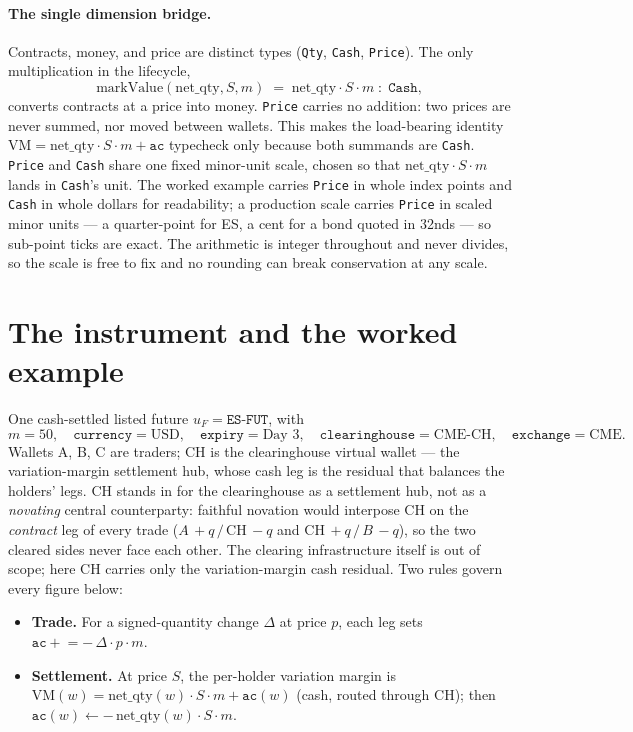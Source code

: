 \documentclass[11pt]{article}
\newcommand{\ac}{\texttt{ac}}
\newcommand{\netq}{\mathrm{net\_qty}}
\newcommand{\code}[1]{\texttt{#1}}
\newcommand{\unit}{u_{F}}
\newcommand{\mult}{m}
\begin{document}
\paragraph{The single dimension bridge.} Contracts, money, and price are distinct types
(\code{Qty}, \code{Cash}, \code{Price}). The only multiplication in the lifecycle,
\[
\mathrm{markValue}(\netq, S, \mult) \;=\; \netq \cdot S \cdot \mult \;:\; \code{Cash},
\]
converts contracts at a price into money. \code{Price} carries no addition: two prices are never
summed, nor moved between wallets. This makes the load-bearing identity
$\mathrm{VM}=\netq\cdot S\cdot\mult+\ac$ typecheck only because both summands are \code{Cash}.
\code{Price} and \code{Cash} share one fixed minor-unit scale, chosen so that $\netq\cdot S\cdot\mult$
lands in \code{Cash}'s unit. The worked example carries \code{Price} in whole index points and
\code{Cash} in whole dollars for readability; a production scale carries \code{Price} in scaled minor
units --- a quarter-point for ES, a cent for a bond quoted in 32nds --- so sub-point ticks are exact.
The arithmetic is integer throughout and never divides, so the scale is free to fix and no rounding can
break conservation at any scale.

\section{The instrument and the worked example}

One cash-settled listed future $\unit=\code{ES-FUT}$, with
\[
\mult=50,\quad \code{currency}=\text{USD},\quad \code{expiry}=\text{Day }3,\quad
\code{clearinghouse}=\text{CME-CH},\quad \code{exchange}=\text{CME}.
\]
Wallets A, B, C are traders; CH is the clearinghouse virtual wallet --- the variation-margin settlement
hub, whose cash leg is the residual that balances the holders' legs. CH stands in for the clearinghouse
as a settlement hub, not as a \emph{novating} central counterparty: faithful novation would interpose CH
on the \emph{contract} leg of every trade ($A\,{+}q\,/\,\text{CH}\,{-}q$ and $\text{CH}\,{+}q\,/\,B\,{-}q$),
so the two cleared sides never face each other. The clearing infrastructure itself is out of scope; here
CH carries only the variation-margin cash residual. Two rules govern every figure below:

\begin{itemize}
\item \textbf{Trade.} For a signed-quantity change $\Delta$ at price $p$, each leg sets
$\ac \mathrel{+}= -\,\Delta\cdot p\cdot \mult$.
\item \textbf{Settlement.} At price $S$, the per-holder variation margin is
$\mathrm{VM}(w)=\netq(w)\cdot S\cdot \mult + \ac(w)$ (cash, routed through CH); then
$\ac(w)\leftarrow -\,\netq(w)\cdot S\cdot \mult$.
\end{itemize}
\end{document}
